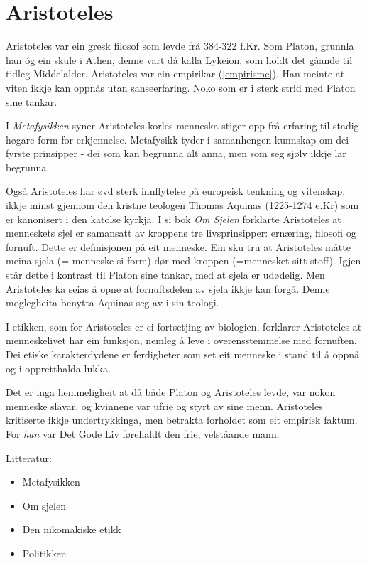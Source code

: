 \documentclass[a4paper]{IEEEtran}
\begin{document}
\section{Aristoteles}
\label{aristoteles}\bigskip

Aristoteles var ein gresk filosof som levde frå 384-322 f.Kr. Som Platon, grunnla han óg ein skule i Athen, denne vart då kalla Lykeion, som holdt det gåande til tidleg Middelalder. Aristoteles var ein empirikar (\ref{empirisme}). Han meinte at viten ikkje kan oppnås utan sanseerfaring. Noko som er i sterk strid med Platon sine tankar.\bigskip

I \textit{Metafysikken} syner Aristoteles korles menneska stiger opp frå erfaring til stadig høgare form for erkjennelse. Metafysikk tyder i samanhengen kunnskap om dei fyrste prinsipper - dei som kan begrunna alt anna, men som seg sjølv ikkje lar begrunna.\bigskip

Også Aristoteles har øvd sterk innflytelse på europeisk tenkning og vitenskap, ikkje minst gjennom den kristne teologen Thomas Aquinas (1225-1274 e.Kr) som er kanonisert i den katolse kyrkja. I si bok \textit{Om Sjelen} forklarte Aristoteles at menneskets sjel er samansatt av kroppens tre livsprinsipper: ernæring, filosofi og fornuft. Dette er definisjonen på eit menneske. Ein sku tru at Aristoteles måtte meina sjela (= menneske si form) dør med kroppen (=mennesket sitt stoff). Igjen står dette i kontrast til Platon sine tankar, med at sjela er udødelig. Men Aristoteles ka seias å opne at fornuftsdelen av sjela ikkje kan forgå. Denne moglegheita benytta Aquinas seg av i sin teologi.\bigskip

I etikken, som for Aristoteles er ei fortsetjing av biologien, forklarer Aristoteles at menneskelivet har ein funksjon, nemleg å leve i overensstemmelse med fornuften. Dei etiske karakterdydene er ferdigheter som set eit menneske i stand til å oppnå og i oppretthalda lukka.\bigskip

Det er inga hemmeligheit at då både Platon og Aristoteles levde, var nokon menneske slavar, og kvinnene var ufrie og styrt av sine menn. Aristoteles kritiserte ikkje undertrykkinga, men betrakta forholdet som eit empirisk faktum. For \textit{han} var Det Gode Liv førehaldt den frie, velståande mann. 

\begin{center}
Litteratur:
\end{center}
\begin{itemize}
    \item Metafysikken
    \item Om sjelen
    \item Den nikomakiske etikk
    \item Politikken
\end{itemize}\newpage
\end{document}
